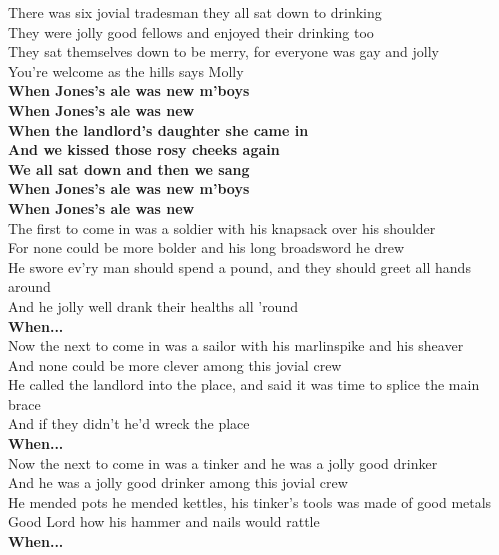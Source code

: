 \documentclass[letterpaper,9pt]{article}
\begin{document}
\large
There was six jovial tradesman they all sat down to drinking \\
They were jolly good fellows and enjoyed their drinking too \\
They sat themselves down to be merry, for everyone was gay and jolly \\
You're welcome as the hills says Molly \\
\textbf{When Jones's ale was new m'boys \\
When Jones's ale was new} \\

\textbf{When the landlord's daughter she came in \\
And we kissed those rosy cheeks again \\
We all sat down and then we sang \\
When Jones's ale was new m'boys \\
When Jones's ale was new} \\

The first to come in was a soldier with his knapsack over his shoulder \\
For none could be more bolder and his long broadsword he drew \\
He swore ev'ry man should spend a pound, and they should greet all hands around \\
And he jolly well drank their healths all 'round \\
\textbf{When...} \\

Now the next to come in was a sailor with his marlinspike and his sheaver \\
And none could be more clever among this jovial crew \\
He called the landlord into the place, and said it was time to splice the main brace \\
And if they didn't he'd wreck the place \\
\textbf{When...} \\

Now the next to come in was a tinker and he was a jolly good drinker \\
And he was a jolly good drinker among this jovial crew \\
He mended pots he mended kettles, his tinker's tools was made of good metals \\
Good Lord how his hammer and nails would rattle \\
\textbf{When...} \\
\end{document}
